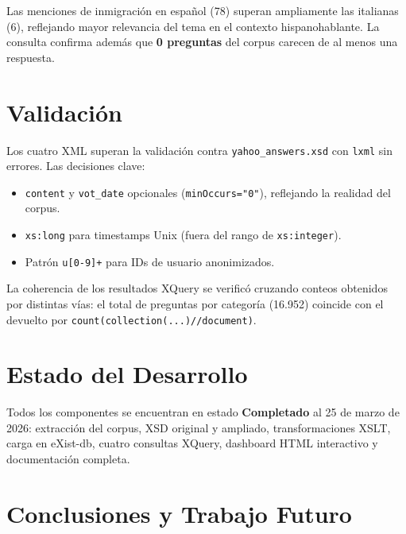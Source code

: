 \documentclass[10pt,twocolumn,a4paper]{article}
\begin{document}
Las menciones de inmigraci\'on en espa\~nol (78) superan ampliamente
las italianas (6), reflejando mayor relevancia del tema en el contexto
hispanohablante. La consulta confirma adem\'as que \textbf{0 preguntas}
del corpus carecen de al menos una respuesta.

\section{Validaci\'on}

Los cuatro XML superan la validaci\'on contra \texttt{yahoo\_answers.xsd}
con \texttt{lxml} sin errores. Las decisiones clave:
\begin{itemize}[leftmargin=1.5em,itemsep=0pt,topsep=2pt]
    \item \texttt{content} y \texttt{vot\_date} opcionales
          (\texttt{minOccurs="0"}), reflejando la realidad del corpus.
    \item \texttt{xs:long} para timestamps Unix (fuera del rango de
          \texttt{xs:integer}).
    \item Patr\'on \texttt{u[0-9]+} para IDs de usuario anonimizados.
\end{itemize}

La coherencia de los resultados XQuery se verific\'o cruzando conteos
obtenidos por distintas v\'ias: el total de preguntas por categor\'ia
(16.952) coincide con el devuelto por \texttt{count(collection(...)//document)}.

\section{Estado del Desarrollo}

Todos los componentes se encuentran en estado
\textcolor{statusgreen}{\textbf{Completado}} al 25 de marzo de 2026:
extracci\'on del corpus, XSD original y ampliado, transformaciones XSLT,
carga en eXist-db, cuatro consultas XQuery, dashboard HTML interactivo y
documentaci\'on completa.

\section{Conclusiones y Trabajo Futuro}
\end{document}
